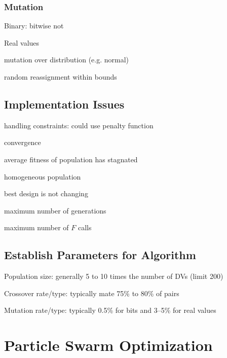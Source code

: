 \documentclass{article}
\begin{document}
\subsubsection*{Mutation}

\begin{itemize*}
\item Binary: bitwise not
\item Real values
  \begin{itemize*}
  \item mutation over distribution (e.g. normal)
  \item random reassignment within bounds
  \end{itemize*}
\end{itemize*}

\subsection*{Implementation Issues}

\begin{itemize*}
\item handling constraints: could use penalty function
\item convergence
  \begin{itemize*}
  \item average fitness of population has stagnated
  \item homogeneous population
  \item best design is not changing
  \item maximum number of generations
  \item maximum number of \(F\) calls
  \end{itemize*}
\end{itemize*}

\subsection*{Establish Parameters for Algorithm}

\begin{itemize*}
\item Population size: generally 5 to 10 times the number of DVs (limit 200)
\item Crossover rate/type: typically mate 75\% to 80\% of pairs
\item Mutation rate/type: typically 0.5\% for bits and 3--5\% for real values
\end{itemize*}

\section{Particle Swarm Optimization}
\end{document}
